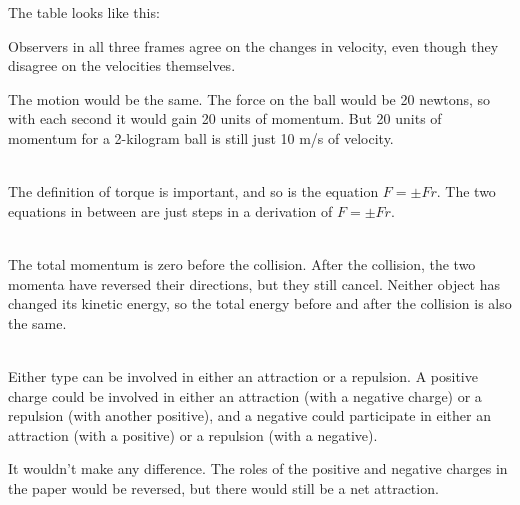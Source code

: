  The table looks like this:


\noindent Observers in all three frames agree on the changes in velocity, even though they disagree
on the velocities themselves.

 The motion would be the same. The force on the ball would be 20 newtons,
so with each second it would gain 20 units of momentum. But 20 units of momentum for a 2-kilogram
ball is still just 10 m/s of velocity.


\noindent{}\\
The definition of torque is important, and so is the equation $F=\pm Fr$. The two equations
in between are just steps in a derivation of  $F=\pm Fr$.


\noindent{}\\
 The total momentum is zero before the collision. After the
collision, the two momenta have reversed their directions, but they still cancel.
Neither object has changed its kinetic energy, so the total energy before and after the collision
is also the same.


\noindent{}\\
 Either type can be involved in either an attraction or a
repulsion. A positive charge could be involved in either an attraction (with a negative
charge) or a repulsion (with another positive), and a negative could participate
in either an attraction (with a positive) or a repulsion (with a negative).

 It wouldn't make any difference. The roles of the positive and
negative charges in the paper would be reversed, but there would still be a net attraction.

